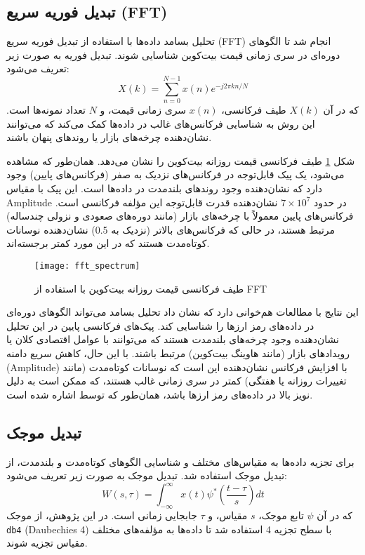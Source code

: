 \subsection{تبدیل فوریه سریع (FFT)}
تحلیل بسامد داده‌ها با استفاده از تبدیل فوریه سریع (FFT) انجام شد تا الگوهای دوره‌ای در سری زمانی قیمت بیت‌کوین شناسایی شوند. تبدیل فوریه به صورت زیر تعریف می‌شود:
\begin{equation}
	X(k) = \sum_{n=0}^{N-1} x(n) e^{-j2\pi kn/N}
\end{equation}
که در آن \(X(k)\) طیف فرکانسی، \(x(n)\) سری زمانی قیمت، و \(N\) تعداد نمونه‌ها است. این روش به شناسایی فرکانس‌های غالب در داده‌ها کمک می‌کند که می‌توانند نشان‌دهنده چرخه‌های بازار یا روندهای پنهان باشند.

شکل \ref{fig:fft_spectrum} طیف فرکانسی قیمت روزانه بیت‌کوین را نشان می‌دهد. همان‌طور که مشاهده می‌شود، یک پیک قابل‌توجه در فرکانس‌های نزدیک به صفر (فرکانس‌های پایین) وجود دارد که نشان‌دهنده وجود روندهای بلندمدت در داده‌ها است. این پیک با مقیاس Amplitude در حدود \(7 \times 10^7\) نشان‌دهنده قدرت قابل‌توجه این مؤلفه فرکانسی است. فرکانس‌های پایین معمولاً با چرخه‌های بازار (مانند دوره‌های صعودی و نزولی چندساله) مرتبط هستند، در حالی که فرکانس‌های بالاتر (نزدیک به 0.5) نشان‌دهنده نوسانات کوتاه‌مدت هستند که در این مورد کمتر برجسته‌اند.

\begin{figure}[H]
	\centering
	\texttt{[image: fft\_spectrum]}
	\caption{طیف فرکانسی قیمت روزانه بیت‌کوین با استفاده از FFT}
	\label{fig:fft_spectrum}
\end{figure}

این نتایج با مطالعات \cite{nguyen2021wavelet} هم‌خوانی دارد که نشان داد تحلیل بسامد می‌تواند الگوهای دوره‌ای در داده‌های رمز ارزها را شناسایی کند. پیک‌های فرکانسی پایین در این تحلیل نشان‌دهنده وجود چرخه‌های بلندمدت هستند که می‌توانند با عوامل اقتصادی کلان یا رویدادهای بازار (مانند هاوینگ بیت‌کوین) مرتبط باشند. با این حال، کاهش سریع دامنه (Amplitude) با افزایش فرکانس نشان‌دهنده این است که نوسانات کوتاه‌مدت (مانند تغییرات روزانه یا هفتگی) کمتر در سری زمانی غالب هستند، که ممکن است به دلیل نویز بالا در داده‌های رمز ارزها باشد، همان‌طور که توسط \cite{fry2018market} اشاره شده است.

\subsection{تبدیل موجک}
برای تجزیه داده‌ها به مقیاس‌های مختلف و شناسایی الگوهای کوتاه‌مدت و بلندمدت، از تبدیل موجک استفاده شد. تبدیل موجک به صورت زیر تعریف می‌شود:
\begin{equation}
	W(s,\tau) = \int_{-\infty}^{\infty} x(t) \psi^*\left(\frac{t-\tau}{s}\right) dt
\end{equation}
که در آن \(\psi\) تابع موجک، \(s\) مقیاس، و \(\tau\) جابجایی زمانی است. در این پژوهش، از موجک \texttt{db4} (Daubechies 4) با سطح تجزیه 4 استفاده شد تا داده‌ها به مؤلفه‌های مختلف مقیاس تجزیه شوند.

